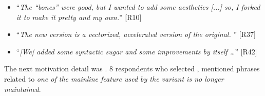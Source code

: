 \begin{itemize}[leftmargin=*]
\item ``\emph{The ``bones'' were good, but I wanted to add some aesthetics [...] %
so, I forked it to make it pretty and my own.}'' [R10]
\item ``\emph{The new version is a vectorized, accelerated version of the original.%
}'' [R37]
\item ``\emph{[We] added some syntactic sugar and some improvements by itself \ldots}'' [R42]
\end{itemize}

\nd The next  motivation detail was .
8 respondents who selected , mentioned phrases related to \emph{one of the mainline feature used by the variant is no longer maintained}.


